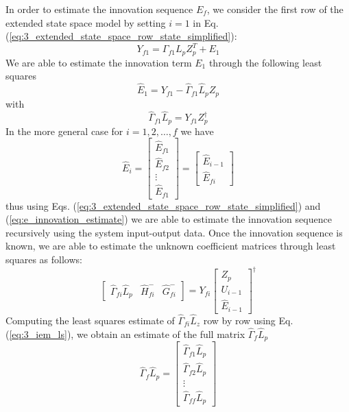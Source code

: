 In order to estimate the innovation sequence $E_f$, we consider the first row of the extended state space model by setting $i = 1$ in Eq. (\ref{eq:3_extended_state_space_row_state_simplified}):
\begin{equation}
Y_{f1} = \Gamma_{f1}L_p Z_p^T + E_{1}
\end{equation}
We are able to estimate the innovation term $E_1$ through the following least squares
\begin{equation}
\hat{E}_1 = Y_{f1} - \hat{\Gamma}_{f1}\hat{L}_p Z_p
\end{equation}
with
\begin{equation}
\hat{\Gamma}_{f1}\hat{L}_p = Y_{f1} Z_p^\dagger
\end{equation}
In the more general case for $i = 1,2,\dots,f$ we have
\begin{equation}\label{eq:e_innovation_estimate}
\hat{E}_i = \begin{bmatrix}\hat{E}_{f1}\\ \hat{E}_{f2}\\ \vdots \\\hat{E}_{f1}\end{bmatrix} = 
\begin{bmatrix} \hat{E}_{i-1}\\\hat{E}_{fi}\end{bmatrix}
\end{equation}
thus using Eqs. (\ref{eq:3_extended_state_space_row_state_simplified}) and (\ref{eq:e_innovation_estimate}) we are able to estimate the innovation sequence recursively using the system input-output data. Once the innovation sequence is known, we are able to estimate the unknown coefficient matrices  through least squares as follows:
\begin{equation}\label{eq:3_iem_ls}
\begin{bmatrix}\hat{\Gamma}_{fi}\hat{L}_p & \hat{H}_{fi}^- & \hat{G}_{fi}^-\end{bmatrix} = Y_{fi}
\begin{bmatrix}Z_p\\ U_{i-1}\\ \hat{E}_{i-1}\end{bmatrix}^\dagger
\end{equation}
Computing the least squares estimate of $\hat{\Gamma}_{fi}\hat{L}_z$ row by row using Eq. (\ref{eq:3_iem_ls}), we obtain an estimate of the full matrix $\hat{\Gamma}_f\hat{L}_p$
\begin{equation*}
\hat{\Gamma}_f \hat{L}_p = \begin{bmatrix}
\hat{\Gamma}_{f1}\hat{L}_p\\ \hat{\Gamma}_{f2}\hat{L}_p\\ \vdots \\ \hat{\Gamma}_{ff}\hat{L}_p
\end{bmatrix}
\end{equation*}
